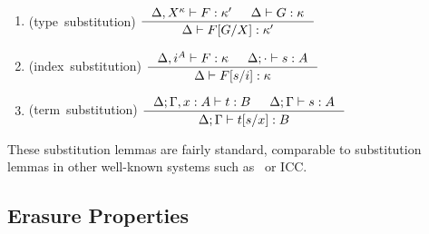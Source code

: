 \begin{lemma}[substitution]\mbox{}\\[-3mm]
\label{lem:subst}
\begin{enumerate}
\item
\label{lem:tysubst}
\mbox{\rm (type substitution)}
$\inference{\Delta,X^\kappa |- F:\kappa' & \Delta |- G:\kappa}
        {\Delta |- F[G/X]:\kappa'} $
\medskip

\item
\label{lem:ixsubst}
\mbox{\rm (index substitution)}
$ \inference{\Delta,i^A |- F:\kappa & \Delta;\cdot |- s:A}
        {\Delta |- F[s/i]:\kappa} $
\medskip

\item
\label{lem:tmsubst}
\mbox{\rm (term substitution)}
$ \inference{\Delta;\Gamma,x:A |- t:B & \Delta;\Gamma |- s:A}
        {\Delta;\Gamma |- t[s/x]:B} $
\end{enumerate}
\end{lemma}
These substitution lemmas are fairly standard,
comparable to substitution lemmas
in other well-known systems such as \Fw\ or ICC.


\subsection{Erasure Properties} \label{ssec:erasure}

